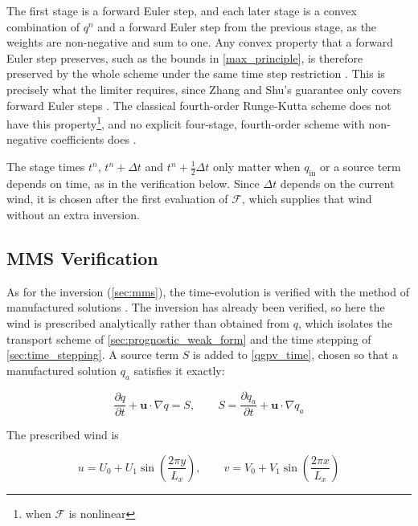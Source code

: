 \documentclass{article}
\begin{document}
The first stage is a forward Euler step, and each later stage is a convex combination of $q^n$ and a forward Euler step from the previous stage, as the weights are non-negative and sum to one.
Any convex property that a forward Euler step preserves, such as the bounds in \cref{max_principle}, is therefore preserved by the whole scheme under the same time step restriction \cite{GottliebShuTadmor2001}.
This is precisely what the limiter requires, since Zhang and Shu's guarantee only covers forward Euler steps \cite{ZhangShu2010}.
The classical fourth-order Runge-Kutta scheme does not have this property\footnote{when $\mathcal{F}$ is nonlinear}, and no explicit four-stage, fourth-order scheme with non-negative coefficients does \cite{GottliebShu1998}.

The stage times $t^n$, $t^n + \Delta t$ and $t^n + \frac{1}{2}\Delta t$ only matter when $q_\text{in}$ or a source term depends on time, as in the verification below.
Since $\Delta t$ depends on the current wind, it is chosen after the first evaluation of $\mathcal{F}$, which supplies that wind without an extra inversion.

\subsection{MMS Verification}\label{sec:prognostic_mms}

As for the inversion (\cref{sec:mms}), the time-evolution is verified with the method of manufactured solutions \cite{Roache2002}.
The inversion has already been verified, so here the wind is prescribed analytically rather than obtained from $q$, which isolates the transport scheme of \cref{sec:prognostic_weak_form} and the time stepping of \cref{sec:time_stepping}.
A source term $S$ is added to \cref{qgpv_time}, chosen so that a manufactured solution $q_a$ satisfies it exactly:

\begin{equation}\label{prog_mms_source}
    \frac{\partial q}{\partial t} + \bm u \cdot \nabla q = S, \qquad S = \frac{\partial q_a}{\partial t} + \bm u \cdot \nabla q_a
\end{equation}

The prescribed wind is

\begin{equation}\label{prog_mms_wind}
    u = U_0 + U_1 \sin\left(\frac{2\pi y}{L_x}\right), \qquad v = V_0 + V_1 \sin\left(\frac{2\pi x}{L_x}\right)
\end{equation}
\end{document}
